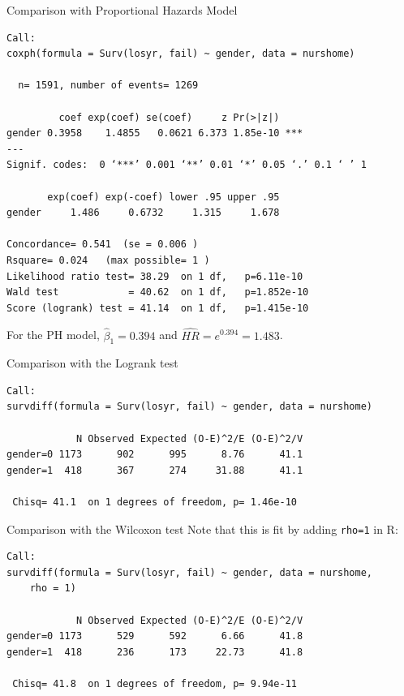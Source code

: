 \documentclass[envcountsect, 10pt, portrait, palatino]{beamer}
\begin{document}
\begin{frame}[fragile]{ Comparison with Proportional Hazards Model}

\scriptsize
\begin{verbatim}
Call:
coxph(formula = Surv(losyr, fail) ~ gender, data = nurshome)

  n= 1591, number of events= 1269

         coef exp(coef) se(coef)     z Pr(>|z|)
gender 0.3958    1.4855   0.0621 6.373 1.85e-10 ***
---
Signif. codes:  0 ‘***’ 0.001 ‘**’ 0.01 ‘*’ 0.05 ‘.’ 0.1 ‘ ’ 1

       exp(coef) exp(-coef) lower .95 upper .95
gender     1.486     0.6732     1.315     1.678

Concordance= 0.541  (se = 0.006 )
Rsquare= 0.024   (max possible= 1 )
Likelihood ratio test= 38.29  on 1 df,   p=6.11e-10
Wald test            = 40.62  on 1 df,   p=1.852e-10
Score (logrank) test = 41.14  on 1 df,   p=1.415e-10
\end{verbatim}
\normalsize
For the PH model, $\hat\beta_1=0.394$ and $\widehat{HR}=e^{0.394}=1.483$.
\end{frame} 
\begin{frame}[fragile]{Comparison with the Logrank test}

\scriptsize
\begin{verbatim}
Call:
survdiff(formula = Surv(losyr, fail) ~ gender, data = nurshome)

            N Observed Expected (O-E)^2/E (O-E)^2/V
gender=0 1173      902      995      8.76      41.1
gender=1  418      367      274     31.88      41.1

 Chisq= 41.1  on 1 degrees of freedom, p= 1.46e-10
 \end{verbatim}
\end{frame} 
\begin{frame}[fragile]{Comparison with the Wilcoxon test}
Note that this is fit by adding {\tt rho=1} in R:
\scriptsize
\begin{verbatim}
Call:
survdiff(formula = Surv(losyr, fail) ~ gender, data = nurshome,
    rho = 1)

            N Observed Expected (O-E)^2/E (O-E)^2/V
gender=0 1173      529      592      6.66      41.8
gender=1  418      236      173     22.73      41.8

 Chisq= 41.8  on 1 degrees of freedom, p= 9.94e-11 
 \end{verbatim}
\end{frame} 
\end{document}
